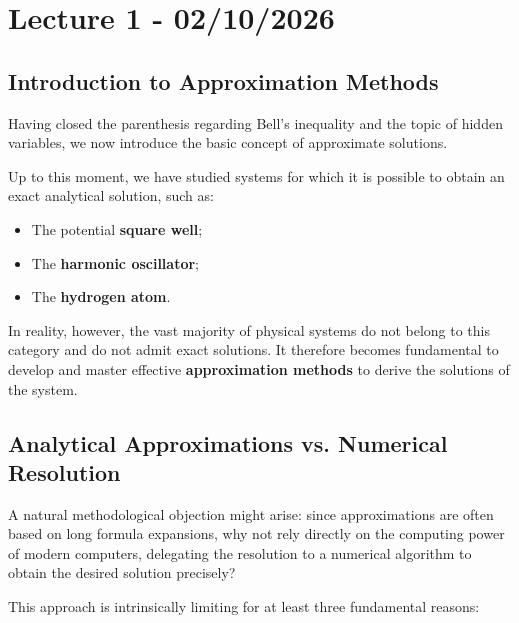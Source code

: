 \chapter{Lecture 1 - 02/10/2026}

\section{Introduction to Approximation Methods}

Having closed the parenthesis regarding Bell's inequality and the topic of hidden variables, we now introduce the basic concept of approximate solutions.

Up to this moment, we have studied systems for which it is possible to obtain an exact analytical solution, such as:
\begin{itemize}
\item The potential \textbf{square well};
\item The \textbf{harmonic oscillator};
\item The \textbf{hydrogen atom}.
\end{itemize}

In reality, however, the vast majority of physical systems do not belong to this category and do not admit exact solutions. It therefore becomes fundamental to develop and master effective \textbf{approximation methods} to derive the solutions of the system.

\section{Analytical Approximations vs. Numerical Resolution}

A natural methodological objection might arise: since approximations are often based on long formula expansions, why not rely directly on the computing power of modern computers, delegating the resolution to a numerical algorithm to obtain the desired solution precisely?

This approach is intrinsically limiting for at least three fundamental reasons:

